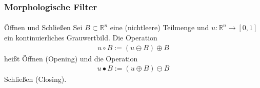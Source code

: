 \documentclass{beamer}
\begin{document}
\begin{frame}
    \frametitle{Morphologische Filter}
\framesubtitle{}

\begin{block}{Öffnen und Schließen}
Sei $B \subset \mathbb{R}^n$ eine (nichtleere) Teilmenge und $u : \mathbb{R}^n \to [ 0,1 ]$ ein kontinuierliches Grauwertbild.
Die Operation 
\begin{align*}
u   \circ B := (u \ominus B) \oplus B
\end{align*}
heißt Öffnen (Opening) und die Operation 
\begin{align*}
u   \bullet B := (u \oplus B) \ominus B
\end{align*}
Schließen (Closing).
\end{block}

 \end{frame}
\end{document}

